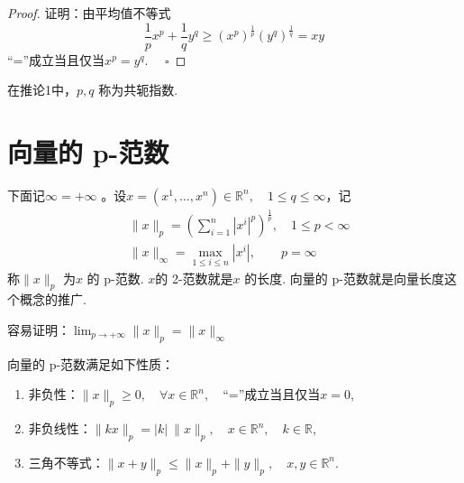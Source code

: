 \documentclass{article}
\begin{document}
\vspace{20pt}

\begin{proof}
    证明：由平均值不等式
\begin{equation*}
    \frac{1}{p} x^p + \frac{1}{q} y^q \ge (x^p)^\frac{1}{p} (y^q)^\frac{1}{q} = xy
\end{equation*}
“=”成立当且仅当\(x^p = y^q\). \(\quad \square\)

\end{proof}

\vspace{20pt}

\begin{remark}
    在推论1中，\(p, q\) 称为共轭指数.
\end{remark}

\newpage

\section{向量的 p-范数}

下面记\(\infty =+ \infty \) 。设\(x =(x^1,\dots ,x^n) \in \mathbb{R}^n,\quad 1 \le q \le \infty \)，记
\begin{align*}
    & \| x\|_p =\left(\sum_{i=1}^n |x^i|^p\right)^\frac{1}{p},\quad 1 \le p < \infty \\
    & \| x\|_{\infty} = \max _{1 \le i \le n }| x^i |,\qquad p = \infty
\end{align*}
称\(\|x\|_p\) 为\(x\) 的 p-范数. \(x\)的 2-范数就是\(x\) 的长度. 向量的 p-范数就是向量长度这个概念的推广.

\vspace{20pt}

\begin{remark}
    容易证明：\(\lim_{p \to + \infty }\|x\|_p =\|x\|_{\infty } \)
\end{remark}

\vspace{20pt}

向量的 p-范数满足如下性质：
\begin{enumerate}
    \item 非负性：\(\|x\|_p \ge 0,\quad \forall x \in \mathbb{R}^n,\quad \)“=”成立当且仅当\(x = 0\),
    \item 非负线性：\(\|kx\|_p = | k |\ \|x\|_p,\quad x \in \mathbb{R}^n,\quad k \in \mathbb{R}\),
    \item 三角不等式：\(\|x + y\|_p \le \|x\|_p +\|y\|_p,\quad x, y \in \mathbb{R}^n\).
\end{enumerate}
\end{document}
